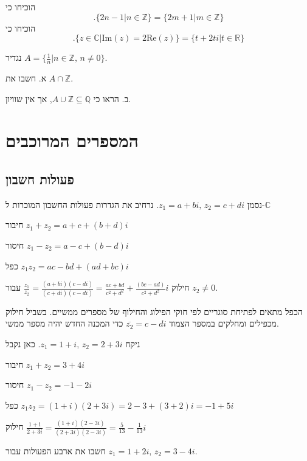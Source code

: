\documentclass[
  hebrew,
  12pt,
  a4paper,
  oneside]{book}
\theoremstyle{definition}
\theoremstyle{remark}
\theoremstyle{plain}
\theoremstyle{remark}
\begin{document}
הוכיחו כי \[.\{2n-1|n\in\mathbb{Z}\}=\{2m+1|m\in\mathbb{Z}\}\] הוכיחו כי
\[.\{z\in\mathbb{C}|\text{{Im}}(z)=2\text{{Re}}(z)\}=\{t+2ti|t\in\mathbb{R}\}\]

נגדיר \(A=\{\frac{1}{n}|n\in\mathbb{Z},\,n\neq0\}\).

א. חשבו את \(A\cap\mathbb{Z}\).

ב. הראו כי \(A\cup\mathbb{Z\subseteq\mathbb{\mathbb{Q}}}\), אך אין
שוויון.


\chapter{המספרים
המרוכבים}\label{ux5d4ux5deux5e1ux5e4ux5e8ux5d9ux5dd-ux5d4ux5deux5e8ux5d5ux5dbux5d1ux5d9ux5dd}

\section{פעולות
חשבון}\label{ux5e4ux5e2ux5d5ux5dcux5d5ux5ea-ux5d7ux5e9ux5d1ux5d5ux5df}

נסמן \(z_{1}=a+bi,\,z_{2}=c+di\). נרחיב את הגדרות פעולות החשבון המוכרות
ל-\(\mathbb{C}\)

חיבור \(z_{1}+z_{2}=a+c+(b+d)i\)

חיסור \(z_{1}-z_{2}=a-c+(b-d)i\)

כפל \(z_{1}z_{2}=ac-bd+(ad+bc)i\)

חילוק
\(\frac{z_{1}}{z_{2}}=\frac{(a+bi)(c-di)}{(c+di)(c-di)}=\frac{ac+bd}{c^{2}+d^{2}}+\frac{(bc-ad)}{c^{2}+d^{2}}i\)
עבור \(z_{2}\neq0\).

הכפל מתאים לפתיחת סוגריים לפי חוקי הפילוג והחילוף של מספרים ממשיים.
בשביל חילוק מכפילים ומחלקים במספר הצמוד \(\overline{z_{2}}=c-di\) כדי
המכנה החדש יהיה מספר ממשי.

\begin{example}

ניקח \(z_{1}=1+i,\,z_{2}=2+3i\). כאן נקבל

חיבור \(z_{1}+z_{2}=3+4i\)

חיסור \(z_{1}-z_{2}=-1-2i\)

כפל \(z_{1}z_{2}=(1+i)(2+3i)=2-3+(3+2)i=-1+5i\)

חילוק
\(\frac{1+\text{i}}{2+3i}=\frac{(1+i)(2-3i)}{(2+3i)(2-3i)}=\frac{5}{13}-\frac{1}{13}i\)

\end{example}

\begin{exercise}

חשבו את ארבע הפעולות עבור \(z_{1}=1+2i,\,z_{2}=3-4i\).

\end{exercise}
\end{document}
